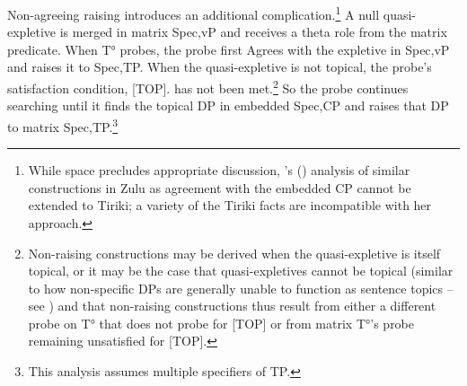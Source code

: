 \documentclass[output=paper,colorlinks,citecolor=brown
]{langscibook}
\begin{document}
\z


Non-agreeing raising introduces an additional complication.\footnote{While space precludes appropriate discussion, \citeauthor{Halpert2019RaisingUnphased}'s (\citeyear{Halpert2019RaisingUnphased}) analysis of similar constructions in Zulu as agreement with the embedded CP cannot be extended to Tiriki; a variety of the Tiriki facts are incompatible with her approach.} A null quasi-expletive is merged in matrix Spec,vP and receives a theta role from the matrix predicate. When T° probes, the probe first Agrees with the expletive in Spec,vP and raises it to Spec,TP. When the quasi-expletive is not topical, the probe's satisfaction condition, [TOP]. has not been met.\footnote{Non-raising constructions may be derived when the quasi-expletive is itself topical, or it may be the case that quasi-expletives cannot be topical (similar to how non-specific DPs are generally unable to function as sentence topics -- see \citealt{ErteschikShir2007InfoStrucBook}) and that non-raising constructions thus result from either a different probe on T° that does not probe for [TOP] or from matrix T°'s probe remaining unsatisfied for [TOP].} So the probe continues searching until it finds the topical DP in embedded Spec,CP and raises that DP to matrix Spec,TP.\footnote{This analysis assumes multiple specifiers of TP.} 

\end{document}
